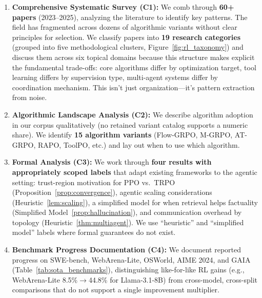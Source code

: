 \documentclass[12pt,a4paper]{report}
\theoremstyle{definition}
\begin{document}
\begin{enumerate}
    \item \textbf{Comprehensive Systematic Survey (C1):} We comb through \textbf{60+ papers} (2023--2025), analyzing the literature to identify key patterns. The field has fragmented across dozens of algorithmic variants without clear principles for selection. We classify papers into \textbf{19 research categories} (grouped into five methodological clusters, Figure~\ref{fig:rl_taxonomy}) and discuss them across six topical domains because this structure makes explicit the fundamental trade-offs: core algorithms differ by optimization target, tool learning differs by supervision type, multi-agent systems differ by coordination mechanism. This isn't just organization—it's pattern extraction from noise.

    \item \textbf{Algorithmic Landscape Analysis (C2):} We describe algorithm adoption in our corpus qualitatively (no retained variant catalog supports a numeric share). We identify \textbf{15 algorithm variants} (Flow-GRPO, M-GRPO, AT-GRPO, RAPO, ToolPO, etc.) and lay out when to use which algorithm.

    \item \textbf{Formal Analysis (C3):} We work through \textbf{four results with appropriately scoped labels} that adapt existing frameworks to the agentic setting: trust-region motivation for PPO vs.\ TRPO (Proposition~\ref{prop:convergence}), agentic scaling considerations (Heuristic~\ref{lem:scaling}), a simplified model for when retrieval helps factuality (Simplified Model~\ref{prop:hallucination}), and communication overhead by topology (Heuristic~\ref{thm:multiagent}). We use ``heuristic'' and ``simplified model'' labels where formal guarantees do not exist.

    \item \textbf{Benchmark Progress Documentation (C4):} We document reported progress on SWE-bench, WebArena-Lite, OSWorld, AIME 2024, and GAIA (Table~\ref{tab:sota_benchmarks}), distinguishing like-for-like RL gains (e.g., WebArena-Lite 8.5\%$\rightarrow$44.8\% for Llama-3.1-8B) from cross-model, cross-split comparisons that do not support a single improvement multiplier.


\end{enumerate}
\end{document}
